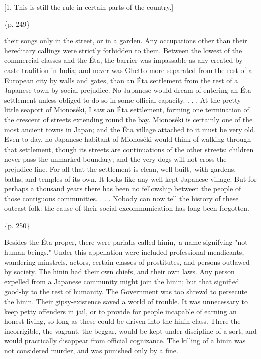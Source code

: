[1. This is still the rule in certain parts of the country.]

\{p. 249\}

their songs only in the street, or in a garden. Any occupations other than their hereditary callings were strictly forbidden to them. Between the lowest of the commercial classes and the Éta, the barrier was impassable as any created by caste-tradition in India; and never was Ghetto more separated from the rest of a European city by walls and gates, than an Éta settlement from the rest of a Japanese town by social prejudice. No Japanese would dream of entering an Éta settlement unless obliged to do so in some official capacity. . . . At the pretty little seaport of Mionoséki, I saw an Éta settlement, forming one termination of the crescent of streets extending round the bay. Mionoséki is certainly one of the most ancient towns in Japan; and the Éta village attached to it must be very old. Even to-day, no Japanese habitant of Mionoséki would think of walking through that settlement, though its streets are continuations of the other streets: children never pass the unmarked boundary; and the very dogs will not cross the prejudice-line. For all that the settlement is clean, well built,--with gardens, baths, and temples of its own. It looks like any well-kept Japanese village. But for perhaps a thousand years there has been no fellowship between the people of those contiguous communities. . . . Nobody can now tell the history of these outcast folk: the cause of their social excommunication has long been forgotten.

\{p. 250\}

Besides the Éta proper, there were pariahs called hinin,--a name signifying "not-human-beings." Under this appellation were included professional mendicants, wandering minstrels, actors, certain classes of prostitutes, and persons outlawed by society. The hinin had their own chiefs, and their own laws. Any person expelled from a Japanese community might join the hinin; but that signified good-by to the rest of humanity. The Government was too shrewd to persecute the hinin. Their gipsy-existence saved a world of trouble. It was unnecessary to keep petty offenders in jail, or to provide for people incapable of earning an honest living, so long as these could be driven into the hinin class. There the incorrigible, the vagrant, the beggar, would be kept under discipline of a sort, and would practically disappear from official cognizance. The killing of a hinin was not considered murder, and was punished only by a fine.



